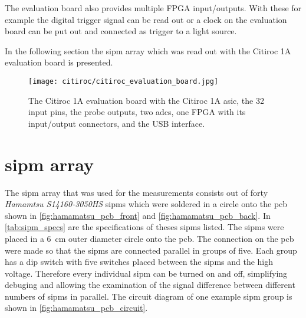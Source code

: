 The evaluation board also provides multiple FPGA input/outputs.
With these for example the digital trigger signal can be read out or a clock on the evaluation board can be put out and connected as trigger to a light source.


In the following section the \ac{sipm} array which was read out with the Citiroc 1A evaluation board is presented. 




\begin{figure}
    \centering
    \texttt{[image: citiroc/citiroc\_evaluation\_board.jpg]}
    \caption{The Citiroc 1A evaluation board with the Citiroc 1A \ac{asic}, the 32 input pins, the probe outputs, two \ac{adc}s, one FPGA with its input/output connectors, and the USB interface.}
    \label{fig:citiroc_evaluation_board}
\end{figure}










\section{\ac{sipm} array}
The \ac{sipm} array that was used for the measurements consists out of forty \textit{Hamamtsu S14160-3050HS} \ac{sipm}s which were soldered in a circle onto the \ac{pcb} shown in \autoref{fig:hamamatsu_pcb_front} and \autoref{fig:hamamatsu_pcb_back}.
In \autoref{tab:sipm_specs} are the specifications of theses \ac{sipm}s listed.
The \ac{sipm}s were placed in a \SI{6}{\centi\meter} outer diameter circle onto the \ac{pcb}.
The connection on the \ac{pcb} were made so that the \ac{sipm}s are connected parallel in groups of five.
Each group has a dip switch with five switches placed between the \ac{sipm}s and the high voltage.
Therefore every individual \ac{sipm} can be turned on and off, simplifying debuging and allowing the examination of the signal difference between different numbers of \ac{sipm}s in parallel.
The circuit diagram of one example \ac{sipm} group is shown in \autoref{fig:hamamatsu_pcb_circuit}. 

